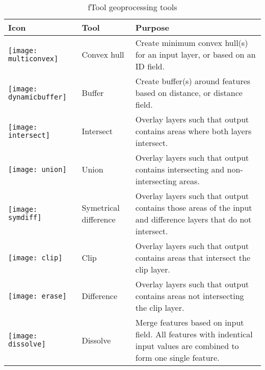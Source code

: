 \begin{table}[ht]
\centering
\caption{fTool geoprocessing tools}\label{tab:ftool_geoprocessing}\medskip
 \begin{tabular}{|p{0.3in}|p{0.8in}|p{5.1in}|}
 \hline \textbf{Icon} & \textbf{Tool} & \textbf{Purpose} \\
 \hline \texttt{[image: multiconvex]} & Convex hull & Create 
minimum convex hull(s) for an input layer, or based on an ID field. \\
 \hline \texttt{[image: dynamicbuffer]} & Buffer & Create 
buffer(s) around features based on distance, or distance field. \\
 \hline \texttt{[image: intersect]} & Intersect & Overlay 
layers such that output contains areas where both layers intersect. \\
 \hline \texttt{[image: union]} & Union & Overlay layers such 
that output contains intersecting and non-intersecting areas. \\
 \hline \texttt{[image: symdiff]} & Symetrical difference & 
Overlay layers such that output contains those areas of the input and 
difference layers that do not intersect. \\
 \hline \texttt{[image: clip]} & Clip & Overlay layers such 
that output contains areas that intersect the clip layer. \\
 \hline \texttt{[image: erase]} & Difference & Overlay layers 
such that output contains areas not intersecting the clip layer. \\
 \hline \texttt{[image: dissolve]} & Dissolve & Merge features 
based on input field. All features with indentical input values are combined 
to form one single feature. \\
 \hline
\end{tabular}
\end{table}

\newpage


